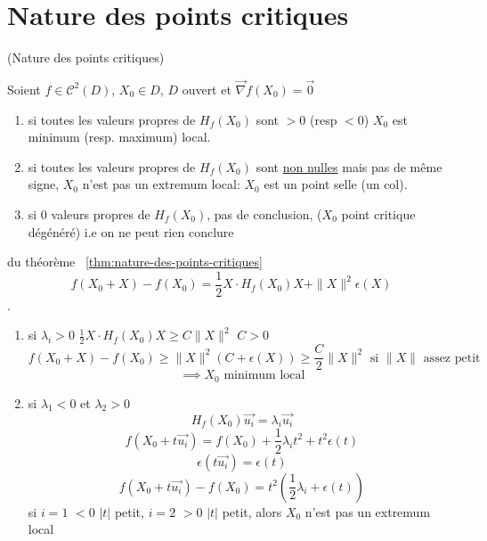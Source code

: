 \section{Nature des points critiques}
\begin{theorem}\label{thm:nature-des-points-critiques}
    (Nature des points critiques) \par
    Soient $f \in \mathcal{C}^2(D)$,  $X_0 \in D$, $D$ ouvert et  $\vec{\nabla }f(X_0) = \vec{0}$
    \begin{enumerate}
        \item si toutes les valeurs propres de $H_f(X_0)$ sont $> 0$ (resp $< 0$) $X_0$ est minimum (resp. maximum) local.
        \item si toutes les valeurs propres de $H_f(X_0)$ sont \underline{non nulles} mais pas de même signe, $X_0$ n'est pas un extremum local: $X_0$ est un point selle (un col).
        \item si 0 valeurs propres de $H_f(X_0)$, pas de conclusion, ($X_0$ point critique dégénéré) i.e on ne peut rien conclure
    \end{enumerate}
\end{theorem}

\begin{preuve} du théorème ~\ref{thm:nature-des-points-critiques}
   \[
       f(X_0 + X) - f(X_0) = \frac{1}{2}X\cdot H_f(X_0)X + \|X\|^2\epsilon(X)
   \]  
   .
   \begin{enumerate}
       \item si $\lambda_i > 0$  $\frac{1}{2}X \cdot H_f(X_0)X \ge C\|X\|^2$ $C > 0$
            \[
           f(X_0 + X) - f(X_0) \ge \|X\|^2(C + \epsilon(X)) \ge \frac{C}{2}\|X\|^2 \text{ si } \|X\| \text{ assez petit }
           \] 
           \[
           \implies X_0 \text{ minimum local}
           \] 
        \item si $\lambda_1 < 0$ et  $\lambda_2 > 0$
             \[
                 H_f(X_0)\vec{u_i} = \lambda_i\vec{u_i}
            \] 
            \[
                f(X_0 + t\vec{u_i}) = f(X_0) + \frac{1}{2} \lambda_it^2 + t^2\epsilon(t)
            \] 
            \[
                \epsilon(t\vec{u_i}) = \epsilon(t)
            \] 
            \[
                f(X_0 + t\vec{u_i}) - f(X_0) = t^2 (\frac{1}{2}\lambda_i + \epsilon(t))
            \] 
            si $i = 1$  $< 0$  $|t|$ petit,  $i = 2$  $> 0$  $|t|$ petit, alors  $X_0$ n'est pas un extremum local
   \end{enumerate}
\end{preuve}

